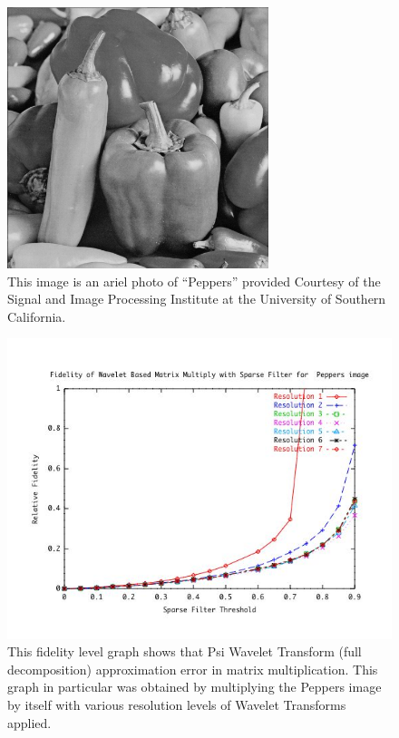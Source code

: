 \begin{figure}
\includegraphics [width=3in]{peppers.jpg}
\caption{This image is an ariel photo of  ``Peppers'' provided Courtesy of the Signal and Image Processing Institute at the University of Southern California.  \cite{peppers}}
\label{image Peppers}
\end{figure}

\begin{figure}
\includegraphics [width=5.5in]{peppersresultsA.jpg}
\caption{This fidelity level graph shows that Psi Wavelet Transform (full decomposition) approximation error in matrix multiplication.  This graph in particular was obtained by multiplying the Peppers image by itself with various resolution levels of Wavelet Transforms applied. \cite{peppers} }
\label{image_peppers_fidelity}
\end{figure}

